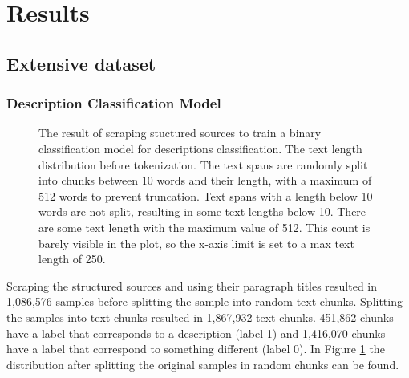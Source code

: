 \documentclass[a4paper, 12pt, oneside]{book} %
\begin{document}

\newpage
\section{Results} \label{par:results}
\subsection{Extensive dataset}
\subsubsection{Description Classification Model}

\begin{figure} [t]
    \centering
    \vspace{0cm}
    \makebox[\textwidth][c]{}
    \caption[Text length distribution for training web crawler model]{The result of scraping stuctured sources to train  a binary classification model for descriptions classification. The text length distribution before tokenization. The text spans are randomly split into chunks between 10 words and their length, with a maximum of 512 words to prevent truncation. Text spans with a length below 10 words are not split, resulting in some text lengths below 10. There are some text length with the maximum value of 512. This count is barely visible in the plot, so the x-axis limit is set to a max text length of 250.}
    \label{fig:text_length_distribution}
\end{figure}
Scraping the structured sources and using their paragraph titles resulted in 1,086,576 samples before splitting the sample into random text chunks.
Splitting the samples into text chunks resulted in 1,867,932 text chunks.
451,862 chunks have a label that corresponds to a description (label 1) and 1,416,070 chunks have a label that correspond to something different (label 0).
In Figure \ref{fig:text_length_distribution} the distribution after splitting the original samples in random chunks can be found.
\end{document}
